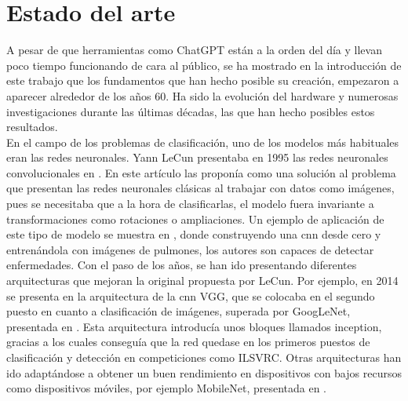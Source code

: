 \chapter{Estado del arte}

	A pesar de que herramientas como ChatGPT están a la orden del día y llevan poco tiempo funcionando de cara al público, se ha mostrado en la introducción de este trabajo que los fundamentos que han hecho posible su creación, empezaron a aparecer alrededor de los años 60. Ha sido la evolución del hardware y numerosas investigaciones durante las últimas décadas, las que han hecho posibles estos resultados. \\
	
	En el campo de los problemas de clasificación, uno de los modelos más habituales eran las redes neuronales. Yann LeCun presentaba en 1995 las redes neuronales convolucionales en \cite{ea_cnn}. En este artículo las proponía como una solución al problema que presentan las redes neuronales clásicas al trabajar con datos como imágenes, pues se necesitaba que a la hora de clasificarlas, el modelo fuera invariante a transformaciones como rotaciones o ampliaciones. Un ejemplo de aplicación de este tipo de modelo se muestra en \cite{medicos_ea}, donde construyendo una \gls{cnn} desde cero y entrenándola con imágenes de pulmones, los autores son capaces de detectar enfermedades. Con el paso de los años, se han ido presentando diferentes arquitecturas que mejoran la original propuesta por LeCun. Por ejemplo, en 2014 se presenta en \cite{ea_vgg} la arquitectura de la \gls{cnn} VGG, que se colocaba en el segundo puesto en cuanto a clasificación de imágenes, superada por GoogLeNet, presentada en \cite{googlenet_ea}. Esta arquitectura introducía unos bloques llamados inception, gracias a los cuales conseguía que la red quedase en los primeros puestos de clasificación y detección en competiciones como ILSVRC. Otras arquitecturas han ido adaptándose a obtener un buen rendimiento en dispositivos con bajos recursos como dispositivos móviles, por ejemplo MobileNet, presentada en \cite{mobilenet_ea}. \\
	
